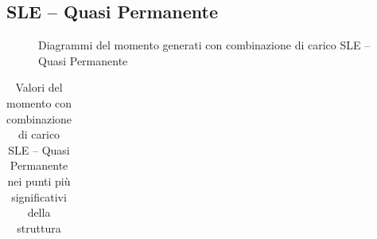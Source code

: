 \clearpage	
\begin{landscape}
\subsection*{SLE -- Quasi Permanente}
\begin{figure}[H]
\centering
{} 
\caption{Diagrammi del momento generati con combinazione di carico SLE -- Quasi Permanente}
\label{fig:Momenti_SLSquasiPermanent}
\end{figure}
\begin{table}[H]
\centering
\caption{Valori del momento con combinazione di carico SLE -- Quasi Permanente nei punti più significativi della struttura}
	\begin{tabular}{lS[table-format=3.2]S[table-format=3.2]S[table-format=3.2]S[table-format=3.2]S[table-format=3.2]S[table-format=3.2]S[table-format=3.2]S[table-format=3.2]S[table-format=3.2]S[table-format=3.2]S[table-format=3.2]S[table-format=3.2]S[table-format=3.2]}

\end{tabular}
\end{table}
\end{landscape}
